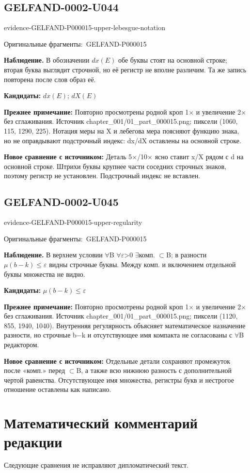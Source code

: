 \documentclass[11pt]{article}
\newcommand{\EvidenceBlock}[4]{%
 \par\smallskip\noindent\begin{minipage}{\linewidth}
 \begin{minipage}[t]{.47\linewidth}\vspace{0pt}\centering
 \csname evidence-#1-#2\endcsname\par
 {\scriptsize\SourceCropCaption\ #1}\par
 \end{minipage}\hfill
 \begin{minipage}[t]{.49\linewidth}\vspace{0pt}\raggedright
 {\small\color{orange!65!black}\textbf{#4} #3}\par
 \end{minipage}
 \end{minipage}\par\smallskip}
\newcommand{\SourceCropCaption}{Оригинальные фрагменты:}\newcommand{\ReadingCaption}{Сомнительное чтение.}\newcommand{\IncompleteCaption}{Неразобранный фрагмент.}\newcommand{\DiagramCaption}{Рисунок и набранное описание.}
\begin{document}
\subsection*{GELFAND-0002-U044}
\EvidenceBlock{GELFAND-P000015}{upper-lebesgue-notation}{В обозначении \(dx(E)\) обе буквы стоят на основной строке; вторая буква выглядит строчной, но её регистр не вполне различим. Та же запись повторена после слов образ её.}{Наблюдение.}
\par\smallskip\noindent\textbf{Кандидаты: } \(dx(E)\); \(dX(E)\)\par
\par\smallskip\noindent\textbf{Прежнее примечание: } Повторно просмотрены родной кроп 1× и увеличение 2× без сглаживания. Источник chapter\_001/01\_part\_000015.png; пиксели (1060, 115, 1290, 225). Нотация меры на X и лебегова мера поясняют функцию знака, но не оправдывают подстрочный индекс: dx/dX оставлены на основной строке.\par
\par\smallskip\noindent\textbf{Новое сравнение с источником: } Деталь 5×/10× ясно ставит x/X рядом с d на основной строке. Штрихи буквы крупнее части соседних строчных знаков, поэтому регистр не установлен. Подстрочный индекс не вставлен.\par

\subsection*{GELFAND-0002-U045}
\EvidenceBlock{GELFAND-P000015}{upper-regularity}{В верхнем условии \(\forall\)B \(\forall\)\(\varepsilon\)>0 \(\exists\)комп. \(\subset\)B; в разности \(\mu(b-k)\leq\varepsilon\) видны строчные буквы. Между комп. и включением отдельной буквы множества не видно.}{Наблюдение.}
\par\smallskip\noindent\textbf{Кандидаты: } \(\mu(b-k)\leq\varepsilon\)\par
\par\smallskip\noindent\textbf{Прежнее примечание: } Повторно просмотрены родной кроп 1× и увеличение 2× без сглаживания. Источник chapter\_001/01\_part\_000015.png; пиксели (1120, 855, 1940, 1040). Внутренняя регулярность объясняет математическое назначение разности, но строчные b−k и отсутствующее имя компакта не согласованы с \(\forall\)B редактором.\par
\par\smallskip\noindent\textbf{Новое сравнение с источником: } Отдельные детали сохраняют промежуток после «комп.» перед \(\subset\)B, а также всю нижнюю разность с дополнительной чертой равенства. Отсутствующее имя множества, регистры букв и нестрогое отношение оставлены как написано.\par
\clearpage\section*{Математический комментарий редакции}
Следующие сравнения не исправляют дипломатический текст.
\end{document}
